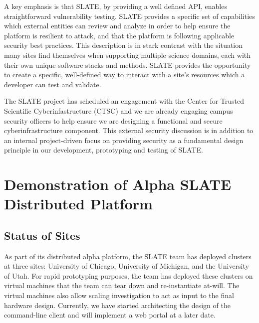 \documentclass[sigconf]{acmart}
\begin{document}
A key emphasis is that SLATE, by providing a well defined API, enables straightforward vulnerability testing. SLATE provides a specific set of capabilities which external entities can review and analyze in order to help ensure the platform is resilient to attack, and that the platform is following applicable security best practices.  This description is in stark contrast with the situation many sites find themselves when supporting multiple science domains, each with their own unique software stacks and methods. SLATE provides the opportunity to create a specific, well-defined way to interact with a site's resources which a developer can test and validate. 

The SLATE project has scheduled an engagement with the Center for Trusted Scientific Cyberinfastructure (CTSC)\cite{CTSC} and we are already engaging campus security officers to help ensure we are designing a functional and secure cyberinfrastructure component.  This external security discussion is in addition to an internal project-driven focus on providing security as a fundamental design principle in our development, prototyping and testing of SLATE.

\section{Demonstration of Alpha SLATE Distributed Platform}

\subsection{Status of Sites}

As part of its distributed alpha platform, the SLATE team has deployed clusters at three sites: University of Chicago, University of Michigan, and the University of Utah.  For rapid prototyping purposes, the team has deployed these clusters on virtual machines that the team can tear down and re-instantiate at-will. The virtual machines also allow scaling investigation to act as input to the final hardware design.  Currently, we have started architecting the design of the command-line client and will implement a web portal at a later date. 
\end{document}
